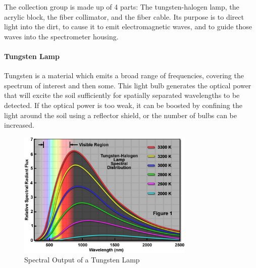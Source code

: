 The collection group is made up of 4 parts: The tungsten-halogen lamp, the acrylic block, the fiber collimator, and the fiber cable. Its purpose is to direct light into the dirt, to cause it to emit electromagnetic waves, and to guide those waves into the spectrometer housing.

\paragraph{Tungsten Lamp} Tungsten is a material which emits a broad range of frequencies, covering the spectrum of interest and then some. This light bulb generates the optical power that will excite the soil sufficiently for spatially separated wavelengths to be detected. If the optical power is too weak, it can be boosted by confining the light around the soil using a reflector shield, or the number of bulbs can be increased.

\begin{figure}[H]
    \caption{Spectral Output of a Tungsten Lamp}
    \centering
    \includegraphics[width=0.75\textwidth]{images/TungstenLamp.jpg}
\end{figure}

